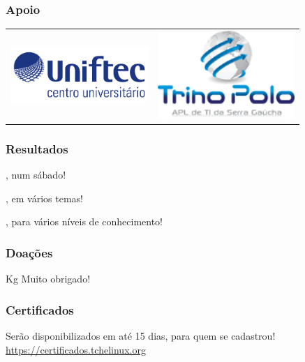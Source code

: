 \begin{frame}
    \frametitle{Apoio}
\begin{center}
\begin{tabular}[h]{cc}
\includegraphics[width=5.2cm]{images/UNIFTEC.png} &
\includegraphics[width=5.2cm]{images/trinopolo.png}
\end{tabular}
\end{center}
\end{frame}

\begin{frame}
    \frametitle{Resultados}

    \begin{description}[labelwidth=\widthof{\bfseries Participantes}]
    \item[Participantes] \participantes, num sábado!
    \item[Palestrantes] \palestrantes, em vários temas!
    \item[Palestras] \palestras, para vários níveis de conhecimento!
    \end{description}

\end{frame}

\begin{frame}
    \frametitle{Doações}

    \begin{center}
    \vfill
        \Large \alimentos Kg \normalsize
    \vfill
        \Large \textbf{\caridade}
    \vfill
        \normalsize Muito obrigado!
    \vfill
    \end{center}

\end{frame}

\begin{frame}
    \frametitle{Certificados}

\begin{center}
Serão disponibilizados em até 15 dias, para quem se cadastrou!
\vfill
\large \url{https://certificados.tchelinux.org}
\end{center}

\end{frame}




